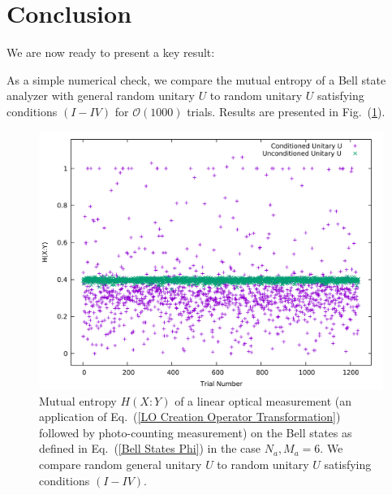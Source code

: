 \documentclass[aps,pra,twocolumn,showpacs,superscriptaddress,floatfix,10pt]{revtex4}
\begin{document}
	\section{Conclusion}
We are now ready to present a key result:
\begin{center}
\end{center}

As a simple numerical check, we compare the mutual entropy of a Bell state analyzer with general random unitary $U$ to random unitary $U$ satisfying conditions $(I- IV)$ for $\mathcal{O}( 1000 )$ trials. Results are presented in Fig.~(\ref{Conditioned vs Uncondition Check}).
\begin{figure}[ht]
	\centering
	\includegraphics[width= 0.48 \textwidth]{./ConditionVsUncondition.pdf}
	\caption{ Mutual entropy $H(X:Y)$ of a linear optical measurement (an application of Eq.~(\ref{LO Creation Operator Transformation}) followed by photo-counting measurement) on the Bell states as defined in Eq.~(\ref{Bell States Phi}) in the case $N_a,M_a = 6$. We compare random general unitary $U$ to random unitary $U$ satisfying conditions $(I-IV)$. }
	\label{Conditioned vs Uncondition Check}
\end{figure}
\end{document}

